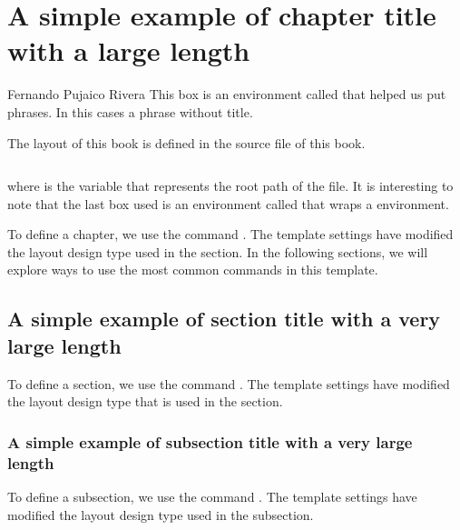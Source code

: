 \chapter{A simple example of chapter title with a large length}

\begin{phrasebox}{}{Fernando Pujaico Rivera}
\label{phrasebox:2}
This box is an environment called  that helped us put phrases. 
In this cases a phrase without title.
\end{phrasebox}


The layout of this book is defined in the  
source file of this book.
\begin{highlightbox}
\begin{verbatim}

\end{verbatim}
\end{highlightbox}
where  is the variable that represents the root path of the  file.
It is interesting to note that the last box used is an environment called  that wraps a  environment.


To define a chapter, we use the command . 
The template settings have modified the layout design type used in the section. 
In the following sections, we will explore ways to use the most common commands in this template.

\section{A simple example of section title with a very large length}

To define a section, we use the command . 
The template settings have modified the layout design type that is used in the section.


\subsection{A simple example of subsection title with a very large length}

To define a subsection, we use the command  . 
The template settings have modified the layout design type used in the subsection.


